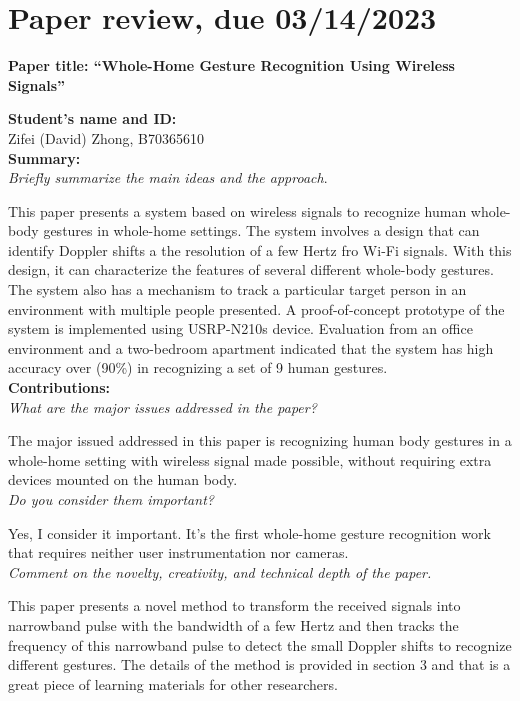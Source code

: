 \documentclass[11pt, oneside]{article}   	%
\begin{document}
\newpage
\section{Paper review, due 03/14/2023}
\begin{center}
\noindent
\textbf{\Large Paper title: ``Whole-Home Gesture Recognition Using Wireless Signals''}
\end{center}


\noindent \textbf{Student's name and ID: }\\
Zifei (David) Zhong, B70365610\\

\noindent \textbf{Summary:}\\
\emph{Briefly summarize the main ideas and the approach}.

This paper presents a system based on wireless signals to recognize human whole-body gestures in whole-home settings. The system involves a design that can identify Doppler shifts a the resolution of a few Hertz fro Wi-Fi signals. With this design, it can characterize the features of several different whole-body gestures. The system also has a mechanism to track a particular target person in an environment with multiple people presented. A proof-of-concept prototype of the system is implemented using USRP-N210s device. Evaluation from an office environment and a two-bedroom apartment indicated that the system has high accuracy over (90\%) in recognizing a set of 9 human gestures.\\

\noindent \textbf{Contributions:}\\
\emph{What are the major issues addressed in the paper?}

The major issued addressed in this paper is recognizing human body gestures in a whole-home setting with wireless signal made possible, without requiring extra devices mounted on the human body.\\


\noindent \emph{Do you consider them important?}

Yes, I consider it important. It's the first whole-home gesture recognition work that requires neither user instrumentation nor cameras.\\


\noindent \emph{Comment on the novelty, creativity, and technical depth of the paper.}

This paper presents a novel method to transform the received signals into narrowband pulse with the bandwidth of a few Hertz and then tracks the frequency of this narrowband pulse to detect the small Doppler shifts to recognize different gestures. The details of the method is provided in section 3 and that is a great piece of learning materials for other researchers. 
\end{document}
